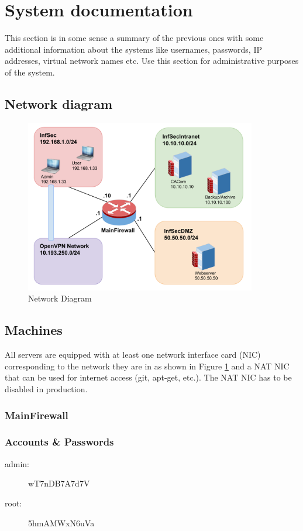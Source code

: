 \documentclass[a4paper, toc=index, 12pt, DIV14, twoside, BCOR2cm, headsepline, numbers=noenddot, bibliography=totoc]{report}
\begin{document}
\section{System documentation}
This section is in some sense a summary of the previous ones with some additional information about the systems like usernames, passwords, IP addresses, virtual network names etc. Use this section for administrative purposes of the system.\newline

\subsection{Network diagram}

\begin{figure}[H]
  \centering
    \includegraphics[width=0.9\textwidth]{images/sysseclab_net_diagram.pdf}  
  \caption{Network Diagram}
  \label{netdiag}
\end{figure}

\subsection{Machines}
All servers are equipped with at least one network interface card (NIC) corresponding to the network they are in as shown in Figure \ref{netdiag} and a NAT NIC that can be used for internet access (git, apt-get, etc.). The NAT NIC has to be disabled in production.

\subsubsection{MainFirewall}
\subsubsection*{Accounts \& Passwords}
\begin{multicols}{2}
\begin{description}
\item[admin:] wT7nDB7A7d7V
\item[root:] 5hmAMWxN6uVa
\end{description}
\end{multicols}
\end{document}
